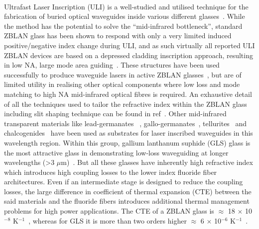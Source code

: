\documentclass[11pt]{article}
\begin{document}
\\Ultrafast Laser Inscription (ULI) is a well-studied and utilised technique for the fabrication of buried optical waveguides inside various different glasses~\cite{Gattass}. While the method has the potential to solve the “mid-infrared bottleneck”, standard ZBLAN glass has been shown to respond with only a very limited induced positive/negative index change during ULI, and as such virtually all reported ULI ZBLAN devices are based on a depressed cladding inscription approach, resulting in low NA, large mode area guiding~\cite{Gross15,Berube13}.  These structures have been used successfully to produce waveguide lasers in active ZBLAN glasses~\cite{Gross_nanoph}, but are of limited utility in realising other optical components where low loss and mode matching to high NA mid-infrared optical fibres is required. An exhaustive detail of all the techniques used to tailor the refractive index within the ZBLAN glass including slit shaping technique can be found in ref~\cite{Gross2012}.
Other mid-infrared transparent materials like lead-germanates ~\cite{Mamoona2021}, gallo-germanates~\cite{Berube2017}, tellurites~\cite{Smayev2018} and chalcogenides~\cite{Gretzinger2015,Rodenas2012} have been used as substrates for laser inscribed waveguides in this wavelength region. Within this group, gallium lanthanum suphide (GLS) glass is the most attractive glass in demonstrating low-loss waveguiding at longer wavelengths (\textgreater 3 $\mu$m)~\cite{Arriola2017}. But all these glasses have inherently high refractive index which introduces high coupling losses to the lower index fluoride fiber architectures. Even if an intermediate stage is designed to reduce the coupling losses, the large difference in coefficient of thermal expansion (CTE) between the said materials and the fluoride fibers introduces additional thermal management problems for high power applications. The CTE of a ZBLAN glass is $\approx$ 18 $\times$ 10$^{-8}$ K$^{-1}$~\cite{Poulain2010}, whereas for GLS it is more than two orders higher $\approx$ 6 $\times$ 10$^{-6}$ K$^{-1}$~\cite{Hewak2010}.\\
\end{document}

